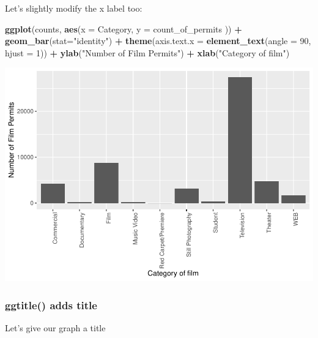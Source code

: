 \documentclass[]{book}
\newenvironment{Shaded}{\begin{snugshade}}{\end{snugshade}}
\newcommand{\KeywordTok}[1]{\textcolor[rgb]{0.13,0.29,0.53}{\textbf{#1}}}
\newcommand{\DataTypeTok}[1]{\textcolor[rgb]{0.13,0.29,0.53}{#1}}
\newcommand{\DecValTok}[1]{\textcolor[rgb]{0.00,0.00,0.81}{#1}}
\newcommand{\StringTok}[1]{\textcolor[rgb]{0.31,0.60,0.02}{#1}}
\newcommand{\OperatorTok}[1]{\textcolor[rgb]{0.81,0.36,0.00}{\textbf{#1}}}
\newcommand{\NormalTok}[1]{#1}
\begin{document}
Let's slightly modify the x label too:

\begin{Shaded}
\begin{Highlighting}[]
\KeywordTok{ggplot}\NormalTok{(counts, }\KeywordTok{aes}\NormalTok{(}\DataTypeTok{x =}\NormalTok{ Category, }\DataTypeTok{y =}\NormalTok{ count_of_permits )) }\OperatorTok{+}
\StringTok{  }\KeywordTok{geom_bar}\NormalTok{(}\DataTypeTok{stat=}\StringTok{"identity"}\NormalTok{) }\OperatorTok{+}\StringTok{ }
\StringTok{  }\KeywordTok{theme}\NormalTok{(}\DataTypeTok{axis.text.x =} \KeywordTok{element_text}\NormalTok{(}\DataTypeTok{angle =} \DecValTok{90}\NormalTok{, }\DataTypeTok{hjust =} \DecValTok{1}\NormalTok{)) }\OperatorTok{+}
\StringTok{  }\KeywordTok{ylab}\NormalTok{(}\StringTok{"Number of Film Permits"}\NormalTok{) }\OperatorTok{+}\StringTok{ }
\StringTok{  }\KeywordTok{xlab}\NormalTok{(}\StringTok{"Category of film"}\NormalTok{)}
\end{Highlighting}
\end{Shaded}

\includegraphics{Statistics_Lab_files/figure-latex/1categoryD-1.pdf}

\subsubsection{ggtitle() adds title}\label{ggtitle-adds-title}

Let's give our graph a title
\end{document}
